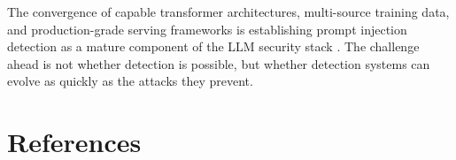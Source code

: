 \documentclass[12pt, letterpaper]{article}   %
\begin{document}
The convergence of capable transformer architectures, multi-source training data, and production-grade serving frameworks is establishing prompt injection detection as a mature component of the LLM security stack \cite{ref37}\cite{ref1}\cite{ref33}. The challenge ahead is not whether detection is possible, but whether detection systems can evolve as quickly as the attacks they prevent.


\newpage
{}
\section{References}
\begingroup
\renewcommand{\section}[2]{}
\end{document}
